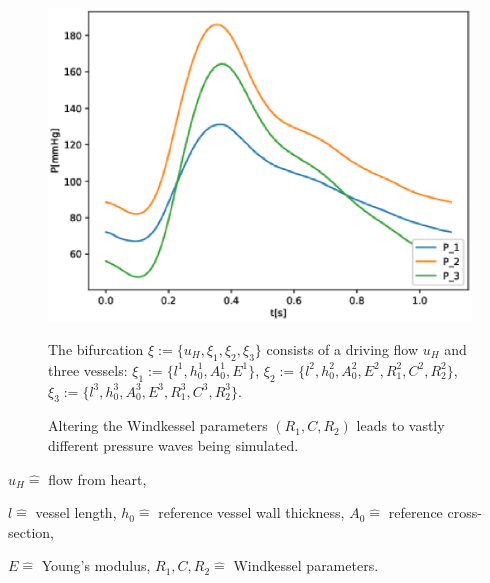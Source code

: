 \documentclass[compress]{beamer}
\begin{document}
\begin{frame}
\begin{figure}
\begin{center}
\begin{minipage}[t][0.35\paperheight][t]{\textwidth}
\begin{minipage}{0.44\textwidth}
					\includegraphics[width=\textwidth]{images/compare_output_params_P_P.eps}
				\end{minipage}

			\end{minipage}
			\hfill
			\begin{minipage}[t][0.34\paperheight][t]{\textwidth}
				\begin{minipage}{0.44\textwidth}
					\caption*{The bifurcation $\xi := \{u_H, \xi_1, \xi_2, \xi_3\}$ consists of a driving flow $u_H$ and three vessels: $\xi_1 := \{l^1, h_0^1, A_0^1, E^1\}$, $\xi_2 := \{l^2, h_0^2, A_0^2, E^2, R_1^2, C^2, R_2^2\}$, $\xi_3 := \{l^3, h_0^3, A_0^3, E^3, R_1^3, C^3, R_2^3\}.$}
				\end{minipage}
				\hfill
				\begin{minipage}{0.44\textwidth}
					\caption*{Altering the Windkessel parameters $(R_1,C,R_2)$ leads to vastly different pressure waves being simulated.}
					\vfill
				\end{minipage}
			\end{minipage}
		\end{center}
	\end{figure}
	\hfill
	\begin{minipage}[t][0.1\paperheight][t]{\textwidth}
		{\tiny \centering 
			$u_H \hat{=}$ flow from heart,

			$l \hat{=}$ vessel length,
			$h_0 \hat{=}$ reference vessel wall thickness,
			$A_0 \hat{=}$ reference cross-section,

			$E \hat{=}$ Young's modulus,
			$R_1, C, R_2 \hat{=}$ Windkessel parameters.
		\par}
	\end{minipage}
\end{frame}
\end{document}
